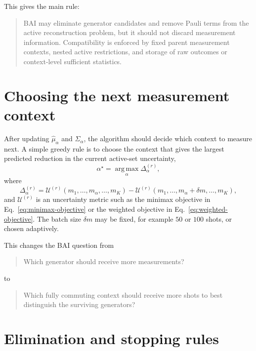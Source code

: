 \documentclass[11pt]{article}
\newcommand{\argmax}{\operatorname*{arg\,max}}
\begin{document}
This gives the main rule:
\begin{quote}
BAI may eliminate generator candidates and remove Pauli terms from the active reconstruction problem, but it should not discard measurement information. Compatibility is enforced by fixed parent measurement contexts, nested active restrictions, and storage of raw outcomes or context-level sufficient statistics.
\end{quote}

\section{Choosing the next measurement context}

After updating $\widehat\mu_\alpha$ and $\widehat\Sigma_\alpha$, the algorithm should decide which context to measure next. A simple greedy rule is to choose the context that gives the largest predicted reduction in the current active-set uncertainty,
\begin{equation}
    \alpha^\star
    =
    \argmax_{\alpha}
    \Delta_\alpha^{(r)},
\end{equation}
where
\begin{equation}
    \Delta_\alpha^{(r)}
    =
    \mathcal U^{(r)}(m_1,\ldots,m_\alpha,\ldots,m_K)
    -
    \mathcal U^{(r)}(m_1,\ldots,m_\alpha+\delta m,\ldots,m_K),
\end{equation}
and $\mathcal U^{(r)}$ is an uncertainty metric such as the minimax objective in Eq.~\eqref{eq:minimax-objective} or the weighted objective in Eq.~\eqref{eq:weighted-objective}. The batch size $\delta m$ may be fixed, for example $50$ or $100$ shots, or chosen adaptively.

This changes the BAI question from
\begin{quote}
Which generator should receive more measurements?
\end{quote}
to
\begin{quote}
Which fully commuting context should receive more shots to best distinguish the surviving generators?
\end{quote}

\section{Elimination and stopping rules}
\end{document}
